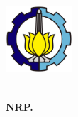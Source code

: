 
    \thispagestyle{empty}

    \BgThispage
    
    \begin{flushleft}
        \includegraphics[width=25mm]{./halaman-depan/00-Logo-ITS.png}
    \end{flushleft}
    
    \vspace{24mm}
    
    \noindent {\textsf{\color{white}{%
    \textbf{\kodeTA} %
    }}}
    
    \vspace{4mm}
    
    \begin{flushleft}
        \noindent {\Large\textsf{\color{white}
        {\MakeUppercase{\textbf{\judulTA}}}}}
    \end{flushleft}
    
    \vspace{4mm}
    
    {\noindent\textsf{\color{white}
    {\MakeUppercase{\textbf{\namaMahasiswa}\\[-2mm]
    \textbf{NRP. \noIndukMahasiswa}}}}}
    
    \vspace{3mm}
    
    {\noindent\textsf{}}
    
    \vspace{3mm}
    
    {\noindent\textsf{\color{white}{%
        \textbf{\namaDepartemen}\\[-2mm]
        \textbf{\namaFakultas}\\[-2mm]
        \textbf{\namaUniversitas}\\[-2mm]
        \textbf{\namaKota}\\[-2mm]
        \textbf{\the\year}
    }}}


